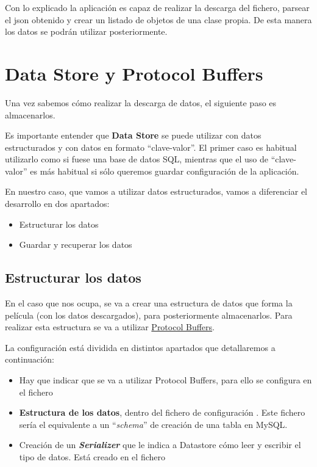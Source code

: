 \documentclass{\ClassPath/viu-tfm-template}
\begin{document}
Con lo explicado la aplicación es capaz de realizar la descarga del fichero, parsear el json obtenido y crear un listado de objetos de una clase propia. De esta manera los datos se podrán utilizar posteriormente.


\section{Data Store y Protocol Buffers}
Una vez sabemos cómo realizar la descarga de datos, el siguiente paso es almacenarlos.

Es importante entender que \textbf{Data Store} se puede utilizar con datos estructurados y con datos en formato “clave-valor”. El primer caso es habitual utilizarlo como si fuese una base de datos SQL, mientras que el uso de “clave-valor” es más habitual si sólo queremos guardar configuración de la aplicación.

En nuestro caso, que vamos a utilizar datos estructurados, vamos a diferenciar el desarrollo en dos apartados:
\begin{itemize}
    \item Estructurar los datos
    \item Guardar y recuperar los datos
\end{itemize}


\subsection{Estructurar los datos}
En el caso que nos ocupa, se va a crear una estructura de datos que forma la película (con los datos descargados), para posteriormente almacenarlos. Para realizar esta estructura se va a utilizar \href{https://developers.google.com/protocol-buffers}{Protocol Buffers}.

La configuración está dividida en distintos apartados que detallaremos a continuación:
\begin{itemize}
    \item Hay que indicar que se va a utilizar Protocol Buffers, para ello se configura en el fichero 

    \item \textbf{Estructura de los datos}, dentro del fichero de configuración . Este fichero sería el equivalente a un “\textit{schema}” de creación de una tabla en MySQL.

    \item Creación de un \textbf{\textit{Serializer}} que le indica a Datastore cómo leer y escribir el tipo de datos. Está creado en el fichero 
\end{itemize}
\end{document}
